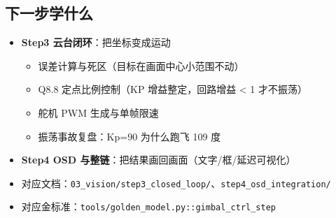 \documentclass[11pt]{ctexart}
\newcommand{\code}[1]{\texttt{#1}}
\begin{document}
\subsection*{下一步学什么}
\begin{itemize}
  \item \textbf{Step3 云台闭环}：把坐标变成运动
  \begin{itemize}
    \item 误差计算与死区（目标在画面中心小范围不动）
    \item Q8.8 定点比例控制（KP 增益整定，回路增益 < 1 才不振荡）
    \item 舵机 PWM 生成与单帧限速
    \item 振荡事故复盘：Kp=90 为什么跑飞 109 度
  \end{itemize}
  \item \textbf{Step4 OSD 与整链}：把结果画回画面（文字/框/延迟可视化）
  \item 对应文档：\code{03\_vision/step3\_closed\_loop/}、\code{step4\_osd\_integration/}
  \item 对应金标准：\code{tools/golden\_model.py::gimbal\_ctrl\_step}
\end{itemize}
\end{document}
